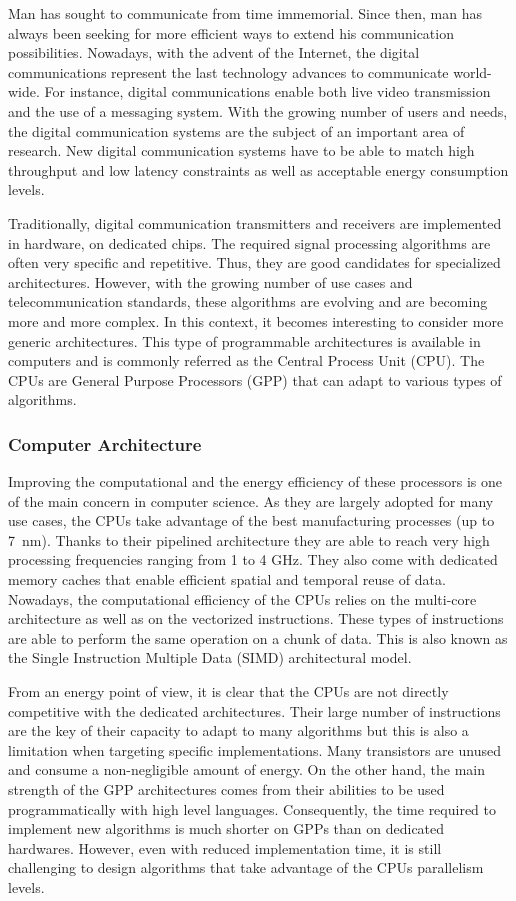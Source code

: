 Man has sought to communicate from time immemorial. Since then, man has always
been seeking for more efficient ways to extend his communication possibilities.
Nowadays, with the advent of the Internet, the digital communications represent
the last technology advances to communicate world-wide. For instance, digital
communications enable both live video transmission and the use of a messaging
system. With the growing number of users and needs, the digital communication
systems are the subject of an important area of research. New digital
communication systems have to be able to match high throughput and low latency
constraints as well as acceptable energy consumption levels.

Traditionally, digital communication transmitters and receivers are implemented
in hardware, on dedicated chips. The required signal processing algorithms are
often very specific and repetitive. Thus, they are good candidates for
specialized architectures. However, with the growing number of use cases and
telecommunication standards, these algorithms are evolving and are becoming more
and more complex. In this context, it becomes interesting to consider more
generic architectures. This type of programmable architectures is available in
computers and is commonly referred as the Central Process Unit (CPU). The CPUs
are General Purpose Processors (GPP) that can adapt to various types of
algorithms.

\subsubsection*{Computer Architecture}

Improving the computational and the energy efficiency of these processors is one
of the main concern in computer science. As they are largely adopted for many
use cases, the CPUs take advantage of the best manufacturing processes (up to
7~nm). Thanks to their pipelined architecture they are able to reach very high
processing frequencies ranging from 1 to 4 GHz. They also come with dedicated
memory caches that enable efficient spatial and temporal reuse of data.
Nowadays, the computational efficiency of the CPUs relies on the multi-core
architecture as well as on the vectorized instructions. These types of
instructions are able to perform the same operation on a chunk of data. This is
also known as the Single Instruction Multiple Data (SIMD) architectural model.

From an energy point of view, it is clear that the CPUs are not directly
competitive with the dedicated architectures. Their large number of instructions
are the key of their capacity to adapt to many algorithms but this is also a
limitation when targeting specific implementations. Many transistors are
unused and consume a non-negligible amount of energy. On the other hand, the
main strength of the GPP architectures comes from their abilities to be used
programmatically with high level languages. Consequently, the time required to
implement new algorithms is much shorter on GPPs than on dedicated hardwares.
However, even with reduced implementation time, it is still challenging to
design algorithms that take advantage of the CPUs parallelism levels.

